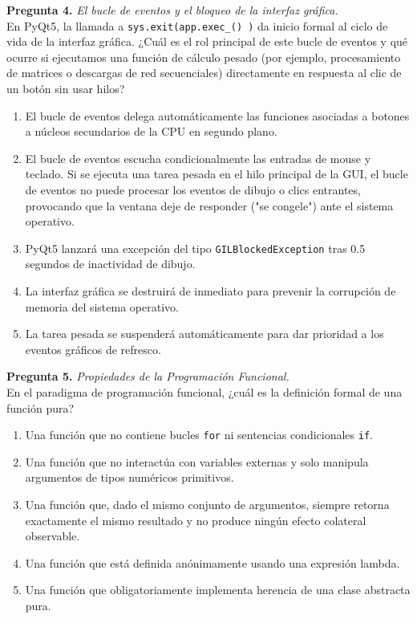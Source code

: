 \documentclass[12pt,letterpaper]{article}
\begin{document}
\textbf{Pregunta 4.} \textit{El bucle de eventos y el bloqueo de la interfaz gráfica.} \\
En PyQt5, la llamada a \texttt{sys.exit(app.exec\_() )} da inicio formal al ciclo de vida de la interfaz gráfica. ¿Cuál es el rol principal de este bucle de eventos y qué ocurre si ejecutamos una función de cálculo pesado (por ejemplo, procesamiento de matrices o descargas de red secuenciales) directamente en respuesta al clic de un botón sin usar hilos?
\begin{enumerate}[label=\alph*)]
  \item El bucle de eventos delega automáticamente las funciones asociadas a botones a núcleos secundarios de la CPU en segundo plano.
  \item El bucle de eventos escucha condicionalmente las entradas de mouse y teclado. Si se ejecuta una tarea pesada en el hilo principal de la GUI, el bucle de eventos no puede procesar los eventos de dibujo o clics entrantes, provocando que la ventana deje de responder ("se congele") ante el sistema operativo.
  \item PyQt5 lanzará una excepción del tipo \texttt{GILBlockedException} tras 0.5 segundos de inactividad de dibujo.
  \item La interfaz gráfica se destruirá de inmediato para prevenir la corrupción de memoria del sistema operativo.
  \item La tarea pesada se suspenderá automáticamente para dar prioridad a los eventos gráficos de refresco.
\end{enumerate}

\bigskip

\textbf{Pregunta 5.} \textit{Propiedades de la Programación Funcional.} \\
En el paradigma de programación funcional, ¿cuál es la definición formal de una función pura?
\begin{enumerate}[label=\alph*)]
  \item Una función que no contiene bucles \texttt{for} ni sentencias condicionales \texttt{if}.
  \item Una función que no interactúa con variables externas y solo manipula argumentos de tipos numéricos primitivos.
  \item Una función que, dado el mismo conjunto de argumentos, siempre retorna exactamente el mismo resultado y no produce ningún efecto colateral observable.
  \item Una función que está definida anónimamente usando una expresión lambda.
  \item Una función que obligatoriamente implementa herencia de una clase abstracta pura.
\end{enumerate}
\end{document}

